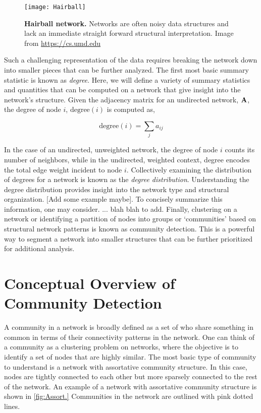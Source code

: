 \begin{figure}
\begin{center}
\texttt{[image: Hairball]}
\caption{{\bf Hairball network.} Networks are often noisy data structures and lack an immediate straight forward structural interpretation. Image from \url{https://cs.umd.edu}}
\label{fig:Hairball}
\end{center}
\end{figure}

Such a challenging representation of the data requires breaking the network down into smaller pieces that can be further analyzed. The first most basic summary statistic is known as \emph{degree}. Here, we will define a variety of summary statistics and quantities that can be computed on a network that give insight into the network's structure. Given the adjacency matrix for an undirected network, ${\bf A}$, the degree of node $i$, $\text{degree}(i)$ is computed as,

\begin{equation}
\text{degree}(i)=\sum_{j}a_{ij}
\end{equation}

In the case of an undirected, unweighted network, the degree of node $i$ counts its number of neighbors, while in the undirected, weighted context, degree encodes the total edge weight incident to node $i$. Collectively examining the distribution of degrees for a network is known as the \emph{degree distribution}. Understanding the degree distribution provides insight into the network type and structural organization. [Add some example maybe]. To concisely summarize this information, one may consider. ... blah blah to add. Finally, clustering on a network or identifying a partition of nodes into groups or `communities' based on structural network patterns is known as community detection. This is a powerful way to segment a network into smaller structures that can be further prioritized for additional analysis. 

\section{Conceptual Overview of Community Detection}
A community in a network is broadly defined as a set of who share something in common in terms of their connectivity patterns in the network. One can think of a community as a clustering problem on networks, where the objective is to identify a set of nodes that are highly similar. The most basic type of community to understand is a network with assortative community structure. In this case, nodes are tightly connected to each other but more sparsely connected to the rest of the network. An example of a network with assortative community structure is shown in \ref{fig:Assort.} Communities in the network are outlined with pink dotted lines.

